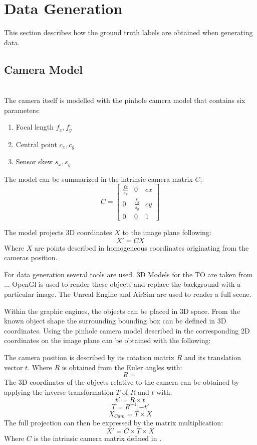 \section{Data Generation}
\label{sec:appendix:datagen}

This section describes how the ground truth labels are obtained when generating data.

\subsection{Camera Model}

\hfill \\
The camera itself is modelled with the pinhole camera model that contains six parameters:

\begin{enumerate}
	\item Focal length $f_x,f_y$
	\item Central point $c_x,c_y$
	\item Sensor skew $s_x, s_y$
\end{enumerate}

The model can be summarized in the intrinsic camera matrix $C$:
\begin{equation}
C = \begin{bmatrix}
\frac{fx}{s_x} & 0 &cx \\
0&  \frac{f_y}{s_y}&cy \\
0& 	0&	1
\end{bmatrix}
\label{eq:pinhole1}
\end{equation}

The model projects 3D coordinates $X$ to the image plane following:
\begin{equation}
X' = C X
\label{eq:pinhole2}
\end{equation}
Where $X$ are points described in homogeneous coordinates originating from the cameras position.

For data generation several tools are used. 3D Models for the \ac{TO} are taken from ... OpenGl is used to render these objects and replace the background with a particular image. The Unreal Engine and AirSim are used to render a full scene.

Within the graphic engines, the objects can be placed in 3D space. From the known object shape the surrounding bounding box can be defined in 3D coordinates. Using the pinhole camera model described in  the corresponding 2D coordinates on the image plane can be obtained with the following:

The camera position is described by its rotation matrix $R$ and its translation vector $t$. Where $R$ is obtained from the Euler angles with:
$$
R =
$$
The 3D coordinates of the objects relative to the camera can be obtained by applying the inverse transformation $T$ of $R$ and $t$ with:
$$
t' = R \times t
$$
$$
T = R^{-1}|-t'
$$
$$
X_{Cam} = T\times X
$$
The full projection can then be expressed by the matrix multiplication:
$$
X' = C\times T\times X
$$
Where $C$ is the intrinsic camera matrix defined in .
